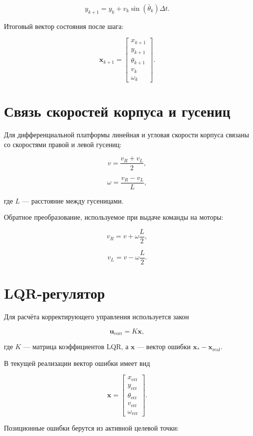 \documentclass[12pt,a4paper]{article}
\newcommand{\vect}[1]{\mathbf{#1}}
\begin{document}
\[
y_{k+1} =
y_k + v_k \sin(\bar{\theta}_k)\Delta t.
\]

Итоговый вектор состояния после шага:

\[
\vect{x}_{k+1}
=
\begin{bmatrix}
x_{k+1} \\
y_{k+1} \\
\theta_{k+1} \\
v_k \\
\omega_k
\end{bmatrix}.
\]

\section{Связь скоростей корпуса и гусениц}

Для дифференциальной платформы линейная и угловая скорости корпуса связаны
со скоростями правой и левой гусениц:

\[
v = \frac{v_R + v_L}{2},
\]

\[
\omega = \frac{v_R - v_L}{L},
\]

где \(L\) — расстояние между гусеницами.

Обратное преобразование, используемое при выдаче команды на моторы:

\[
v_R = v + \omega \frac{L}{2},
\]

\[
v_L = v - \omega \frac{L}{2}.
\]

\section{LQR-регулятор}

Для расчёта корректирующего управления используется закон

\[
\vect{u}_{\mathrm{corr}} = K\vect{x},
\]

где \(K\) — матрица коэффициентов LQR, а \(\vect{x}\) — вектор ошибки
\(\vect{x}_{*} - \vect{x}_{\mathrm{real}}\).

В текущей реализации вектор ошибки имеет вид

\[
\vect{x}
=
\begin{bmatrix}
x_{\mathrm{err}} \\
y_{\mathrm{err}} \\
\theta_{\mathrm{err}} \\
v_{\mathrm{err}} \\
\omega_{\mathrm{err}}
\end{bmatrix}.
\]

Позиционные ошибки берутся из активной целевой точки:
\end{document}
